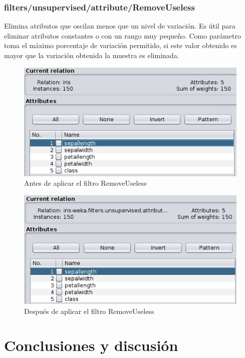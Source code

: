 \documentclass[11pt,twoside,a4paper]{book}
\begin{document}
\subsection{filters/unsupervised/attribute/RemoveUseless}
Elimina atributos que oscilan menos que un nivel de variación. Es útil para
eliminar atributos constantes o con un rango muy pequeño. Como parámetro toma el máximo porcentaje de variación permitido, si este valor obtenido es mayor que la variación
obtenida la muestra es eliminada.

\begin{figure}[H]
   \includegraphics[width=\textwidth]{RemoveUseless1.png}
	\caption{Antes de aplicar el filtro RemoveUseless}
	\label{Fig23}
\end{figure}
\begin{figure}[H]
   \includegraphics[width=\textwidth]{RemoveUseless2.png}
	\caption{Después de aplicar el filtro RemoveUseless}
	\label{Fig24}
\end{figure}

\chapter{Conclusiones y discusión}
\end{document}
